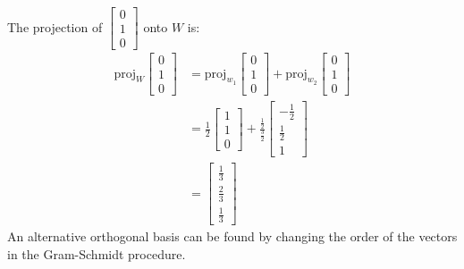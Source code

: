 \documentclass{article}
\begin{document}
The projection of $\begin{bmatrix} 0 \\ 1 \\ 0 \end{bmatrix}$ onto $W$ is:
\begin{equation}
    \begin{split}
        \mathrm{proj}_W \begin{bmatrix}
            0 \\ 1 \\ 0
        \end{bmatrix} & = \mathrm{proj}_{w_1} \begin{bmatrix}
            0 \\ 1 \\ 0
        \end{bmatrix} + \mathrm{proj}_{w_2} \begin{bmatrix}
            0 \\ 1 \\ 0
        \end{bmatrix} \\
        & = \frac{1}{2}\begin{bmatrix}1 \\ 1 \\ 0\end{bmatrix} + \frac{\frac{1}{2}}{\frac{3}{2}}\begin{bmatrix}-\frac{1}{2} \\ \frac{1}{2} \\ 1\end{bmatrix} \\
        & = \begin{bmatrix}\frac{1}{3} \\ \frac{2}{3} \\ \frac{1}{3}\end{bmatrix}
    \end{split}
\end{equation}
An alternative orthogonal basis can be found by changing the order of the vectors in the Gram-Schmidt procedure.
\end{document}
